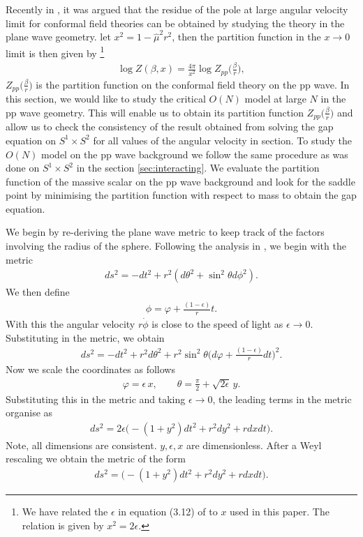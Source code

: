 \documentclass[a4paper,11pt]{article}
\begin{document}
Recently in \cite{Komargodski:2026ain}, it was argued that the residue of the pole at  large angular velocity limit 
for conformal field theories can be obtained by studying the theory in the plane wave geometry. 
let $x^2 = 1- \hat \mu^2 r^2 $, 
then the  partition function in the $x\rightarrow 0 $ limit  is then given by  \footnote{We have related the 
	$\epsilon $ in equation (3.12)  of \cite{Komargodski:2026ain} to $x$ used in this paper. The relation is given by $x^2 = 2\epsilon$.  }
\begin{eqnarray}
	\log Z( \beta , x) = \frac{4\pi   }{x^2}  \log Z_{pp} \Big( \frac{\beta}{r}  \Big) ,
\end{eqnarray}
$Z_{pp} \big( \frac{\beta}{r} \big)$ is the partition function  on the conformal field theory on the pp wave. 
In this section, we would like to study the critical  $O(N)$ model at large $N$ in the pp wave geometry. 
This will enable us to obtain its partition function  $Z_{pp} \big( \frac{\beta}{r} \big) $ and allow us to 
check the consistency of the result obtained  from solving the gap equation  on $S^1\times S^2$ 
for all values of the angular velocity 
in section. 
To study the $O(N)$ model on the pp wave background 
we follow the same procedure as was done on $S^1\times S^2$ in the section \ref{sec:interacting}. 
We  evaluate the partition function of the massive scalar  on the pp wave background and look for the 
saddle point by minimising the partition function with respect to mass to obtain the gap equation. 

We begin by  re-deriving  the plane wave metric to keep track  of the factors involving the radius of the sphere. 
Following the 
analysis in  \cite{Komargodski:2026ain}, 
we begin with the metric
\begin{eqnarray}
	ds^2 = - dt^2 + r^2 ( d\theta^2 + \sin^2 \theta d\phi^2) .
\end{eqnarray}
We then define 
\begin{eqnarray}
	\phi =\varphi + \frac{(1-\epsilon)}{r}t.
\end{eqnarray}
With this the angular velocity $r\dot\phi $ is close to the speed of light as $\epsilon\to0$. 
Substituting in the metric, we obtain 
\begin{eqnarray}
	ds^2 = - dt^2 + r^2 d\theta^2 + r^2 \sin^2 \theta 
	\Big( d\varphi +  \frac{(1-\epsilon)}{r}dt \Big)^2 .
\end{eqnarray}
Now we scale the coordinates as follows
\begin{eqnarray}
	\varphi = \epsilon \,x , \qquad \theta = \frac{\pi}{2} + \sqrt{2\epsilon}\, y . 
\end{eqnarray}
Substituting this  in the metric and taking $\epsilon\rightarrow 0$, the leading terms in the metric organise as 
\begin{eqnarray}
	ds^2 = 2 \epsilon \Big( -( 1+ y^2 ) dt^2 + r^2 dy^2 + r dx dt\Big) .
\end{eqnarray}
Note, all dimensions are consistent. $y, \epsilon, x $ are dimensionless.
After a Weyl rescaling we obtain the metric of the form 
\begin{eqnarray} \label{ppwave}
	ds^2 = \Big( -( 1+ y^2 ) dt^2 + r^2 dy^2 + r dx dt\Big) .
\end{eqnarray}
\end{document}
